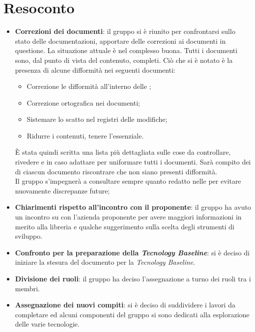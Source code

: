 \section{Resoconto}
\begin{itemize}
\item \textbf{Correzioni dei documenti}: il gruppo si è riunito per confrontarsi sullo stato delle documentazioni, apportare delle correzioni ai documenti in questione. La situazione attuale è nel complesso buona. Tutti i documenti sono, dal punto di vista del contenuto, completi. Ciò che si è notato è la presenza di alcune difformità nei seguenti documenti:
	\begin{itemize}
		\item Correzione le difformità all'interno delle  \NdPv{};
		\item Correzione ortografica nei documenti;
		\item Sistemare lo scatto nel registri delle modifiche;
		\item Ridurre i contenuti, tenere l'essenziale.
	\end{itemize} 
È stata quindi scritta una lista più dettagliata sulle cose da controllare, rivedere e in caso adattare per uniformare tutti i documenti. Sarà compito dei  di ciascun documento riscontrare che non siano presenti difformità. \\
Il gruppo s'impegnerà a consultare sempre quanto redatto nelle \NdPv{} per evitare nuovamente discrepanze future;

\item\textbf{Chiarimenti rispetto all'incontro con il proponente}: il gruppo ha avuto un incontro su  con l'azienda  proponente per avere maggiori informazioni in merito alla libreria  e qualche suggerimento sulla scelta degli strumenti di sviluppo.

\item\textbf{Confronto per la preparazione della \textit{Tecnology Baseline}}: si è deciso di iniziare la stesura del documento per la \textit{Tecnology Baseline}.

\item \textbf{Divisione dei ruoli}: il gruppo ha deciso l'assegnazione a turno dei ruoli tra i membri.

\item \textbf{Assegnazione dei nuovi compiti}: si è deciso di suddividere i lavori da completare ed alcuni componenti del gruppo si sono dedicati alla esplorazione delle varie tecnologie.
\end{itemize}
\newpage